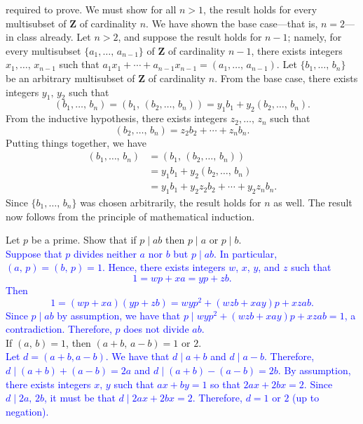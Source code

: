 \documentclass[a4paper,11pt]{article}
\theoremstyle{mythm}
\theoremstyle{mydef}
\newcommand{\blue}[1]{\textcolor{blue}{#1}}
\newcommand{\Z}{\mathbf{Z}}
\begin{document}
{\begin{enumerate}[(a)]
required to prove. We must show for all $n>1$, the result holds for every
multisubset of $\Z$ of cardinality $n$. We have shown the base case---that is,
$n=2$---in class already. Let $n>2$, and suppose the result holds for $n-1$;
namely, for every multisubset $\{a_1,\dots,\,a_{n-1}\}$ of $\Z$ of cardinality
$n-1$, there exists integers $x_1,\dots,\,x_{n-1}$ such that
$a_1x_1+\cdots+a_{n-1}x_{n-1}=(a_1,\dots,\,a_{n-1})$. Let $\{b_1,\dots,\,b_n\}$
be an arbitrary multisubset of $\Z$ of cardinality $n$. From the base case,
there exists integers $y_1,\,y_2$ such that
\[
  (b_1,\dots,\,b_n) = (b_1,\,(b_2,\dots,\,b_n)) = y_1b_1 + y_2(b_2,\dots,\,b_n).
\]
From the inductive hypothesis, there exists integers $z_2,\dots,\,z_n$ such that
\[
  (b_2,\dots,\,b_n) = z_2b_2+\cdots+z_nb_n.
\]
Putting things together, we have
\begin{align*}
  (b_1,\dots,\,b_n) &= (b_1,\,(b_2,\dots,\,b_n)) \\
                    &= y_1b_1+y_2(b_2,\dots,\,b_n) \\
                    &= y_1b_1+y_2z_2b_2+\cdots+y_2z_nb_n.
\end{align*}
Since $\{b_1,\dots,\,b_n\}$ was chosen arbitrarily, the result holds for $n$ as
well. The result now follows from the principle of mathematical induction.
\end{enumerate}}

 Let $p$ be a prime. Show that if $p \mid ab$ then $p
\mid a$ or $p \mid b$. \\

\blue{Suppose that $p$ divides neither $a$ nor $b$ but $p \mid ab$. In
particular, $(a,\,p)=(b,\,p)=1$. Hence, there exists integers $w$, $x$, $y$, and
$z$ such that
  \[
    1 = wp+xa = yp+zb.
  \]
  Then
  \[
    1=(wp+xa)(yp+zb) = wyp^2+(wzb+xay)p+xzab.
  \]
  Since $p \mid ab$ by assumption, we have that $p \mid
  wyp^2+(wzb+xay)p+xzab=1$, a contradiction. Therefore, $p$ does not divide
  $ab$.} \\

 If $(a,\,b)=1$, then $(a+b,\,a-b)=1\text{ or }2$. \\

\blue{Let $d=(a+b,a-b)$. We have that $d \mid a+b$ and $d \mid a-b$. Therefore,
  $d \mid (a+b)+(a-b)=2a$ and $d \mid (a+b)-(a-b)=2b$. By assumption, there
  exists integers $x,\,y$ such that $ax+by=1$ so that $2ax+2bx=2$. Since $d \mid
  2a,\,2b$, it must be that $d \mid 2ax+2bx=2$. Therefore, $d=1\text{ or }2$ (up
  to negation).} \\
\end{document}
